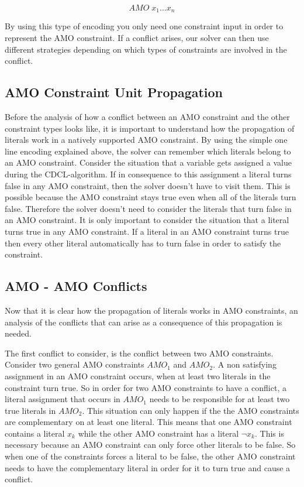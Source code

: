\begin{leftbar}
\begin{displaymath}
AMO \; x_1 ... x_n
\end{displaymath}
\end{leftbar}
By using this type of encoding you only need one constraint input in order to represent the AMO constraint. If a conflict arises, our solver can then use different strategies depending on which types of constraints are involved in the conflict.

\subsection{AMO Constraint Unit Propagation}

Before the analysis of how a conflict between an AMO constraint and the other constraint types looks like, it is important to understand how the propagation of literals work in a natively supported AMO constraint. By using the simple one line encoding explained above, the solver can remember which literals belong to an AMO constraint. Consider the situation that a variable gets assigned a value during the CDCL-algorithm. If in consequence to this assignment a literal turns false in any AMO constraint, then the solver doesn’t have to visit them. This is possible because the AMO constraint stays true even when all of the literals turn false. Therefore the solver doesn't need to consider the literals that turn false in an AMO constraint. It is only important to consider the situation that a literal turns true in any AMO constraint. If a literal in an AMO constraint turns true then every other literal automatically has to turn false in order to satisfy the constraint.

\subsection{AMO - AMO Conflicts}

Now that it is clear how the propagation of literals works in AMO constraints, an analysis of the conflicts that can arise as a consequence of this propagation is needed.


The first conflict to consider, is the conflict between two AMO constraints. Consider two general AMO constraints $AMO_1$ and $AMO_2$. A non satisfying assignment in an AMO constraint occurs, when at least two literals in the constraint turn true. So in order for two AMO constraints to have a conflict, a literal assignment that occurs in $AMO_1$ needs to be responsible for at least two true literals in $AMO_2$. This situation can only happen if the the AMO constraints are complementary on at least one literal. This means that one AMO constraint contains a literal $x_k$ while the other AMO constraint has a literal $\neg x_k$. This is necessary because an AMO constraint can only force other literals to be false. So when one of the constraints forces a literal to be false, the other AMO constraint needs to have the complementary literal in order for it to turn true and cause a conflict.

